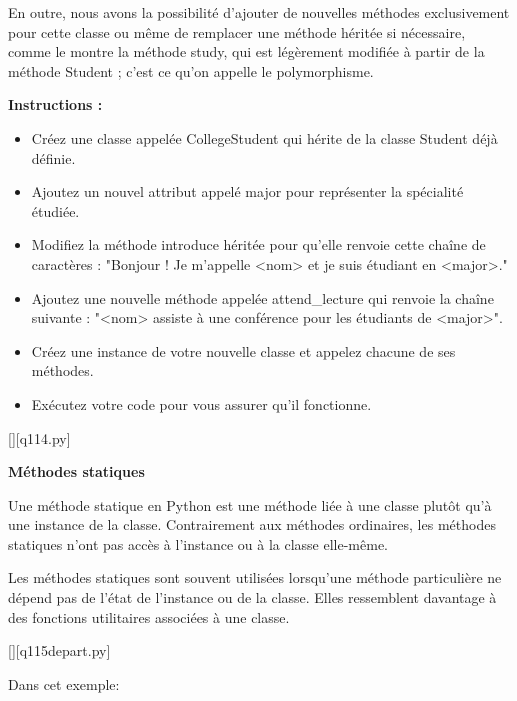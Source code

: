 		En outre, nous avons la possibilité d'ajouter de nouvelles méthodes exclusivement pour cette classe ou même de remplacer une méthode héritée si nécessaire, comme le montre la méthode study, qui est légèrement modifiée à partir de la méthode Student ; c'est ce qu'on appelle le polymorphisme.
		
		\textbf{Instructions :}

		\begin{itemize}
		\item Créez une classe appelée CollegeStudent qui hérite de la classe Student déjà définie.
		\item Ajoutez un nouvel attribut appelé major pour représenter la spécialité étudiée.
		\item Modifiez la méthode introduce héritée pour qu'elle renvoie cette chaîne de caractères :\newline
		"Bonjour ! Je m'appelle <nom> et je suis étudiant en <major>."
		\item Ajoutez une nouvelle méthode appelée attend\_lecture qui renvoie la chaîne suivante :\newline
		"<nom> assiste à une conférence pour les étudiants de <major>".
		\item Créez une instance de votre nouvelle classe et appelez chacune de ses méthodes. 
		\item Exécutez votre code pour vous assurer qu'il fonctionne.
		\end{itemize}
    \par
    \renewcommand{\nomfichier}{q114.py}
    \begin{solution}
        \pythonfile{\chemincode \nomfichier}[][\nomfichier]
    \end{solution}
    
		\question
		\textbf{Méthodes statiques}
		
		Une méthode statique en Python est une méthode liée à une classe plutôt qu'à une instance de la classe. Contrairement aux méthodes ordinaires, les méthodes statiques n'ont pas accès à l'instance ou à la classe elle-même.
		
		Les méthodes statiques sont souvent utilisées lorsqu'une méthode particulière ne dépend pas de l'état de l'instance ou de la classe. Elles ressemblent davantage à des fonctions utilitaires associées à une classe.
		
		\renewcommand{\nomfichier}{q115depart.py}
		\pythonfile{\chemincode \nomfichier}[][\nomfichier]
		
		Dans cet exemple:
		
